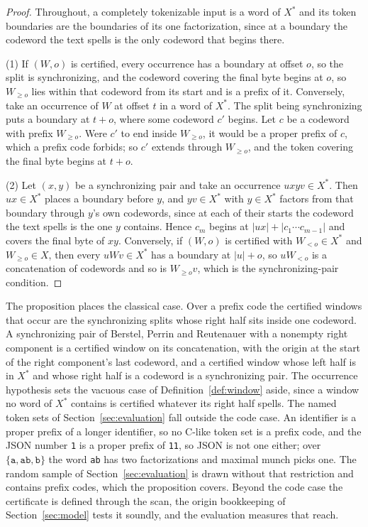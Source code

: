 \documentclass[11pt,a4paper]{article}
\theoremstyle{definition}
\theoremstyle{plain}
\newcommand{\code}[1]{\texttt{#1}}
\begin{document}
\begin{proof}
Throughout, a completely tokenizable input is a word of $X^*$ and its token boundaries are the boundaries of its one
factorization, since at a boundary the codeword the text spells is the only codeword that begins there.

(1) If $(W, o)$ is certified, every occurrence has a boundary at offset $o$, so the split is synchronizing, and the
codeword covering the final byte begins at $o$, so $W_{\geq o}$ lies within that codeword from its start and is a prefix
of it. Conversely, take an occurrence of $W$ at offset $t$ in a word of $X^*$. The split being synchronizing puts a
boundary at $t + o$, where some codeword $c'$ begins. Let $c$ be a codeword with prefix $W_{\geq o}$. Were $c'$ to end
inside $W_{\geq o}$, it would be a proper prefix of $c$, which a prefix code forbids; so $c'$ extends through
$W_{\geq o}$, and the token covering the final byte begins at $t + o$.

(2) Let $(x, y)$ be a synchronizing pair and take an occurrence $u x y v \in X^*$. Then $u x \in X^*$ places a boundary
before $y$, and $y v \in X^*$ with $y \in X^*$ factors from that boundary through $y$'s own codewords, since at each of
their starts the codeword the text spells is the one $y$ contains. Hence $c_m$ begins at $|u x| + |c_1 \cdots c_{m-1}|$
and covers the final byte of $xy$. Conversely, if $(W, o)$ is certified with $W_{<o} \in X^*$ and $W_{\geq o} \in X$,
then every $u W v \in X^*$ has a boundary at $|u| + o$, so $u W_{<o}$ is a concatenation of codewords and so is
$W_{\geq o} v$, which is the synchronizing-pair condition.
\end{proof}

The proposition places the classical case. Over a prefix code the certified windows that occur are the synchronizing
splits whose right half sits inside one codeword. A synchronizing pair of Berstel, Perrin and Reutenauer with a nonempty
right component is a certified window on its concatenation, with the origin at the start of the right component's last
codeword, and a certified window whose left half is in $X^*$ and whose right half is a codeword is a synchronizing pair.
The occurrence hypothesis sets the vacuous case of Definition~\ref{def:window} aside, since a window no word of $X^*$
contains is certified whatever its right half spells. The named token sets of Section~\ref{sec:evaluation} fall outside
the code case. An identifier is a proper prefix of a longer identifier, so no C-like token set is a prefix code, and the
JSON number \code{1} is a proper prefix of \code{11}, so JSON is not one either; over
$\{\code{a}, \code{ab}, \code{b}\}$ the word \code{ab} has two factorizations and maximal munch picks one. The random
sample of Section~\ref{sec:evaluation} is drawn without that restriction and contains prefix codes, which the
proposition covers. Beyond the code case the certificate is defined through the scan, the origin bookkeeping of
Section~\ref{sec:model} tests it soundly, and the evaluation measures that reach.
\end{document}
